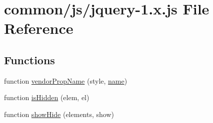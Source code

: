 \hypertarget{jquery-1_8x_8js}{}\section{common/js/jquery-\/1.x.\+js File Reference}
\label{jquery-1_8x_8js}
\subsection*{Functions}
\begin{DoxyCompactItemize}
\item 
function \hyperlink{jquery-1_8x_8js_a6a111234d6e26ce833f8fabd50819b7a}{vendor\+Prop\+Name} (style, \hyperlink{common_8js_a22c29d2aa8ed6161ce8faa718ef76e68}{name})
\item 
function \hyperlink{jquery-1_8x_8js_a67ed58d688ff11991ca2826ebfbf28a4}{is\+Hidden} (elem, el)
\item 
function \hyperlink{jquery-1_8x_8js_a002b8e481f3ab2a83194366aceb7a706}{show\+Hide} (elements, show)
\item 

\end{DoxyCompactItemize}
